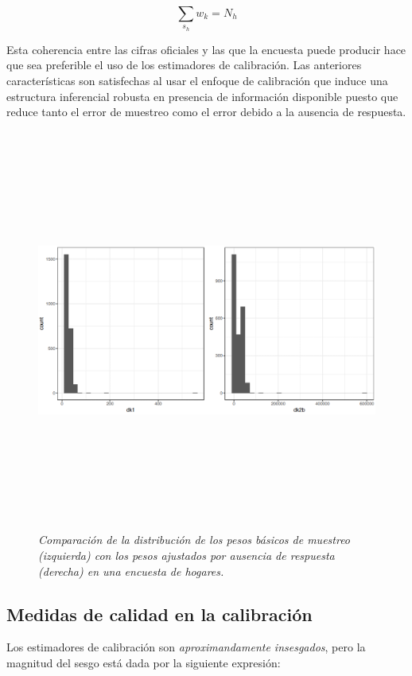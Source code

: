 \documentclass[
  10pt,
  spanish,
]{book}
\begin{document}
\[
\sum_{s_h} w_k = N_h
\]

Esta coherencia entre las cifras oficiales y las que la encuesta puede producir hace que sea preferible el uso de los estimadores de calibración. Las anteriores características son satisfechas al usar el enfoque de calibración que induce una estructura inferencial robusta en presencia de información disponible puesto que reduce tanto el error de muestreo como el error debido a la ausencia de respuesta.

\begin{figure}
\centering
\includegraphics[width=\textwidth,height=5.20833in]{Pics/17.png}
\caption{\emph{Comparación de la distribución de los pesos básicos de muestreo (izquierda) con los pesos ajustados por ausencia de respuesta (derecha) en una encuesta de hogares.}}
\end{figure}

\hypertarget{medidas-de-calidad-en-la-calibraciuxf3n}{%
\subsection{Medidas de calidad en la calibración}\label{medidas-de-calidad-en-la-calibraciuxf3n}}

Los estimadores de calibración son \emph{aproximandamente insesgados}, pero la magnitud del sesgo está dada por la siguiente expresión:
\end{document}
